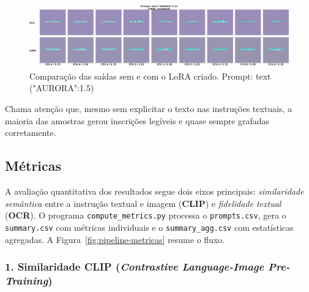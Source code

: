 \documentclass[12pt, %
openright, 
oneside, %
a4paper,    %
brazil]{facom-ufu-abntex2}
\begin{document}
\begin{figure}[H]
    \centering
    \includegraphics[width=1.0\linewidth]{figuras/resultados/good/fix_text/p1_batch0.png}
    \caption[Comparação das saídas sem e com o LoRA criado.]{Comparação das saídas sem e com o LoRA criado. Prompt: text ("AURORA":1.5)}
    \label{fig:FixTextP1Batch0}
\end{figure}

Chama atenção que, mesmo sem explicitar o texto nas instruções textuais, a maioria das amostras gerou inscrições legíveis e quase sempre grafadas corretamente.

\subsection{Métricas}

A avaliação quantitativa dos resultados segue dois eixos principais: \emph{similaridade semântica}
entre a instrução textual e imagem (\textbf{CLIP}) e \emph{fidelidade textual} (\textbf{OCR}).
O programa \verb|compute_metrics.py| processa o \verb|prompts.csv|,
gera o \verb|summary.csv| com métricas individuais e o \verb|summary_agg.csv|
com estatísticas agregadas. A Figura~\ref{fig:pipeline-metricas} resume o fluxo.

\subsubsection*{1. Similaridade CLIP (\emph{Contrastive Language-Image Pre-Training})}
\end{document}
